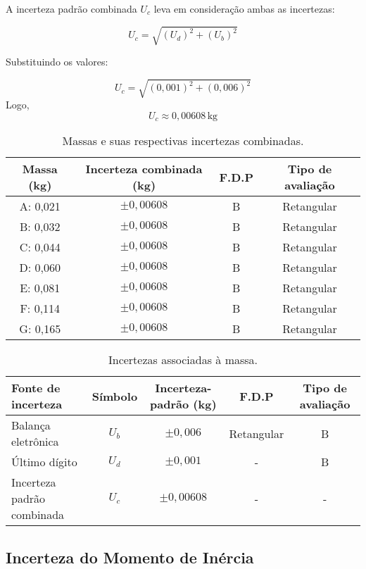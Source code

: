 \documentclass[a4papper, 10pt]{article}
\begin{document}
A incerteza padrão combinada \(\textit{U}_c\) leva em consideração ambas as incertezas:

\[
\textit{U}_c = \sqrt{ (\textit{U}_d)^2 + (\textit{U}_b)^2 }
\]

Substituindo os valores:

\[
\textit{U}_c = \sqrt{ (0{,}001)^2 + (0{,}006)^2 }
\]
Logo, 
\[
\textit{U}_c \approx 0{,}00608 \, \text{kg}
\]
\begin{table}[H]
\centering
\begin{tabular}{|c|c|c|c|}
\hline
\textbf{Massa (kg)} & \textbf{Incerteza combinada (kg)} & \textbf{F.D.P} & \textbf{Tipo de avaliação} \\
\hline
A: 0{,}021 & $\pm 0{,}00608$ & B & Retangular \\
B: 0{,}032 & $\pm 0{,}00608$ & B & Retangular \\
C: 0{,}044 & $\pm 0{,}00608$ & B & Retangular \\
D: 0{,}060 & $\pm 0{,}00608$ & B & Retangular \\
E: 0{,}081 & $\pm 0{,}00608$ & B & Retangular \\
F: 0{,}114 & $\pm 0{,}00608$ & B & Retangular \\
G: 0{,}165 & $\pm 0{,}00608$ & B & Retangular \\
\hline
\end{tabular}
\caption{Massas e suas respectivas incertezas combinadas.}
\end{table}

\vspace{1cm} %

\begin{table}[H]
\centering
\begin{tabular}{|l|c|c|c|c|}
\hline
\textbf{Fonte de incerteza} & \textbf{Símbolo} & \textbf{Incerteza-padrão (kg)} & \textbf{F.D.P} & \textbf{Tipo de avaliação} \\
\hline
Balança eletrônica & \(\textit{U}_b\) & $\pm 0{,}006$ & Retangular & B \\
Último dígito & \(\textit{U}_d\) & $\pm 0{,}001$ & - & B \\
Incerteza padrão combinada & \(\textit{U}_c\) & $\pm 0{,}00608$ & - & - \\
\hline
\end{tabular}
\caption{Incertezas associadas à massa.}
\end{table}

\vspace{0.10 cm}
\subsection{Incerteza do Momento de Inércia}
\vspace{0.10 cm}
\end{document}
